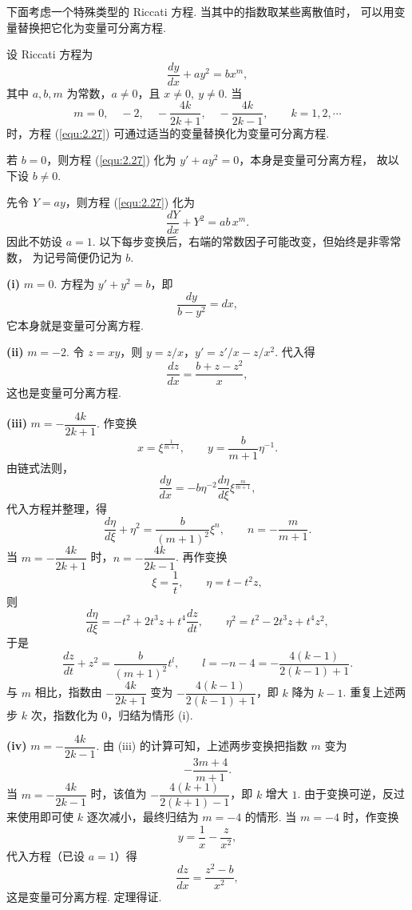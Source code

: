 下面考虑一个特殊类型的 Riccati 方程. 当其中的指数取某些离散值时，
可以用变量替换把它化为变量可分离方程.

\begin{thm}
设 Riccati 方程为
\begin{equation}\label{equ:2.27}
\frac{dy}{dx}+ay^2=bx^m,
\end{equation}
其中 $a,b,m$ 为常数，$a\neq0$，且 $x\neq0,\ y\neq0$. 当
\begin{equation}\label{equ:2.28}
m=0,\quad -2,\quad -\frac{4k}{2k+1},\quad -\frac{4k}{2k-1},\qquad k=1,2,\cdots
\end{equation}
时，方程 (\ref{equ:2.27}) 可通过适当的变量替换化为变量可分离方程.
\end{thm}
\begin{pf1}
若 $b=0$，则方程 (\ref{equ:2.27}) 化为 $y'+ay^2=0$，本身是变量可分离方程，
故以下设 $b\neq0$.

先令 $Y=ay$，则方程 (\ref{equ:2.27}) 化为
\[
\frac{dY}{dx}+Y^2=ab\,x^m.
\]
因此不妨设 $a=1$. 以下每步变换后，右端的常数因子可能改变，但始终是非零常数，
为记号简便仍记为 $b$.

\textbf{(i)} $m=0$. 方程为 $y'+y^2=b$，即
\[
\frac{dy}{b-y^2}=dx,
\]
它本身就是变量可分离方程.

\textbf{(ii)} $m=-2$. 令 $z=xy$，则 $y=z/x$，$y'=z'/x-z/x^2$. 代入得
\[
\frac{dz}{dx}=\frac{b+z-z^2}{x},
\]
这也是变量可分离方程.

\textbf{(iii)} $m=-\dfrac{4k}{2k+1}$. 作变换
\[
x=\xi^{\frac{1}{m+1}},\qquad y=\frac{b}{m+1}\eta^{-1}.
\]
由链式法则，
\[
\frac{dy}{dx}=-b\eta^{-2}\frac{d\eta}{d\xi}\xi^{\frac{m}{m+1}},
\]
代入方程并整理，得
\[
\frac{d\eta}{d\xi}+\eta^2=\frac{b}{(m+1)^2}\xi^n,
\qquad n=-\frac{m}{m+1}.
\]
当 $m=-\dfrac{4k}{2k+1}$ 时，$n=-\dfrac{4k}{2k-1}$. 再作变换
\[
\xi=\frac{1}{t},\qquad \eta=t-t^2z,
\]
则
\[
\frac{d\eta}{d\xi}=-t^2+2t^3z+t^4\frac{dz}{dt},
\qquad
\eta^2=t^2-2t^3z+t^4z^2,
\]
于是
\[
\frac{dz}{dt}+z^2=\frac{b}{(m+1)^2}t^l,
\qquad l=-n-4=-\frac{4(k-1)}{2(k-1)+1}.
\]
与 $m$ 相比，指数由 $-\dfrac{4k}{2k+1}$ 变为 $-\dfrac{4(k-1)}{2(k-1)+1}$，即 $k$ 降为 $k-1$.
重复上述两步 $k$ 次，指数化为 $0$，归结为情形 (i).

\textbf{(iv)} $m=-\dfrac{4k}{2k-1}$. 由 (iii) 的计算可知，上述两步变换把指数 $m$ 变为
\[
-\frac{3m+4}{m+1}.
\]
当 $m=-\dfrac{4k}{2k-1}$ 时，该值为 $-\dfrac{4(k+1)}{2(k+1)-1}$，即 $k$ 增大 $1$.
由于变换可逆，反过来使用即可使 $k$ 逐次减小，最终归结为 $m=-4$ 的情形.
当 $m=-4$ 时，作变换
\[
y=\frac{1}{x}-\frac{z}{x^2},
\]
代入方程（已设 $a=1$）得
\[
\frac{dz}{dx}=\frac{z^2-b}{x^2},
\]
这是变量可分离方程. 定理得证.
\end{pf1}

